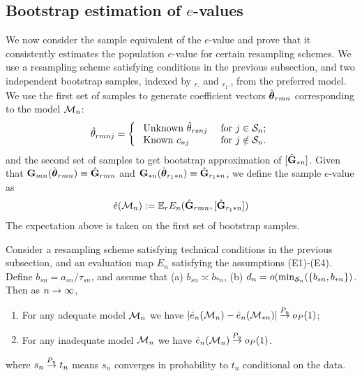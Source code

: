 
\subsection{Bootstrap estimation of $e$-values}


We now consider the sample equivalent of the $e$-value and prove that it consistently estimates the population $e$-value for certain resampling schemes. We use a resampling scheme satisfying conditions in the previous subsection, and two independent bootstrap samples, indexed by ${}_{r .}$ and ${}_{r_1 .}$, from the preferred model. We use the first set of samples to generate coefficient vectors $\hat {{\boldsymbol{\theta}}}_{r m n}$ corresponding to the model ${\cal{M}}_n$:
%
\begin{align}\label{eqn:bootEstEqn}
 \hat{\theta}_{r m n j} = \left\{ \begin{array}{ll}
 \text{ Unknown} \ \hat{\theta}_{r s n j} & \text{ for } 
 			j \in {\cal{S}}_{n}; \\
 \text{ Known} \  c_{nj} & \text{ for } j \notin {\cal{S}}_{n}.
\end{array}
\right.
\end{align}
%
and the second set of samples to get bootstrap approximation of $[\hat {{\mathbf{G}}}_{* n}]$. Given that ${\mathbf{G}}_{m n} ( \hat {{\boldsymbol{\theta}}}_{r m n} ) \equiv \hat {{\mathbf{G}}}_{r m n}$ and ${\mathbf{G}}_{* n} ( \hat {{\boldsymbol{\theta}}}_{r_1 * n} ) \equiv \hat {{\mathbf{G}}}_{r_1 * n}$, we define the sample $e$-value as
%
\begin{align}
\hat e( {\cal{M}}_n ) := {\mathbb{E}}_r E_n ( \hat {{\mathbf{G}}}_{r m n}, [ \hat {{\mathbf{G}}}_{r_1 * n} ] )
\end{align}
%
The expectation above is taken on the first set of bootstrap samples.

\begin{Theorem}
\label{Theorem:ModelScore}
Consider a resampling scheme satisfying technical conditions in the previous subsection, and an evaluation map $E_n$ satisfying the assumptions (E1)-(E4). Define $b_{s n} = a_{s n} / \tau_{s n}$, and assume that (a) $b_{s n} \asymp b_{* n}$, (b) $d_n = o( \min_{{\cal{S}}_n} (\{ b_{s n}, b_{* n} \})$. Then as $n \rightarrow \infty$,

\begin{enumerate}
\item For any adequate model ${\cal{M}}_n$ we have $| \hat e_n ({\cal{M}}_n ) - \hat e_n ({\cal{M}}_{* n} ) | \stackrel{P_n}{\rightarrow} o_P (1)$;

\item For any inadequate model ${\cal{M}}_n$ we have $\hat e_n ({\cal{M}}_n ) \stackrel{P_n}{\rightarrow} o_P (1)$. 
\end{enumerate}
%
where $s_n \stackrel{P_n}{\rightarrow} t_n $ means $s_n$ converges in probability to $t_n$ conditional on the data.
\end{Theorem}

